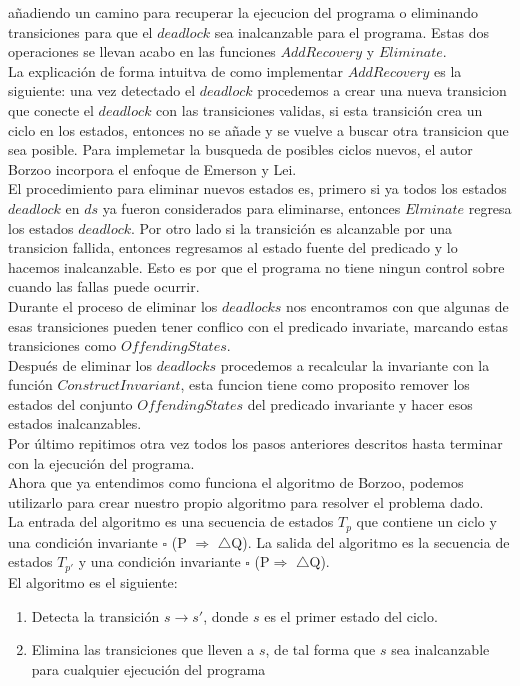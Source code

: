 \documentclass{article}
\begin{document}
\begin{enumerate}
{añadiendo un camino para recuperar la ejecucion del programa o
eliminando transiciones para que el $deadlock$ sea inalcanzable para
el programa. Estas dos operaciones se llevan acabo en las funciones
$AddRecovery$ y $Eliminate$.\\
La explicación de forma intuitva de como implementar $AddRecovery$ es
la siguiente: una vez detectado el $deadlock$ procedemos a crear una
nueva transicion que conecte el $deadlock$ con las transiciones
validas, si esta transición crea un ciclo en los estados, entonces no
se añade y se vuelve a buscar otra transicion que sea posible. Para
implemetar la busqueda de posibles ciclos nuevos, el autor Borzoo
incorpora el enfoque de Emerson y Lei.\\
El procedimiento para eliminar nuevos estados es, primero si ya todos
los estados $deadlock$ en $ds$ ya fueron considerados para eliminarse,
entonces $Elminate$ regresa los estados $deadlock$. Por otro lado si la
transición es alcanzable por una transicion fallida, entonces
regresamos al estado fuente del predicado y lo hacemos
inalcanzable. Esto es por que el programa no tiene ningun control
sobre cuando las fallas puede ocurrir.\\ 
Durante el proceso de eliminar los $deadlocks$ nos encontramos con que
algunas de esas transiciones pueden tener conflico con el predicado
invariate, marcando estas transiciones como $OffendingStates$.\\
Después de eliminar los $deadlocks$ procedemos a recalcular la
invariante con la función $ConstructInvariant$, esta funcion tiene
como proposito remover los estados del conjunto $OffendingStates$ del
predicado invariante y hacer esos estados inalcanzables.\\
Por último repitimos otra vez todos los pasos anteriores descritos hasta
terminar con la ejecución del programa.\\

Ahora que ya entendimos como funciona el algoritmo de Borzoo, podemos
utilizarlo para crear nuestro propio algoritmo para resolver el
problema dado.\\
La entrada del algoritmo es una secuencia de estados $T_p$ que
contiene un ciclo y una condición invariante $\square$ (P
$\Rightarrow$ $\triangle$Q).
La salida del algoritmo es la secuencia de estados $T_{p'}$ y una
condición invariante $\square$ (P$\Rightarrow$ $\triangle$Q).\\
El algoritmo es el siguiente:
\begin{enumerate}
  \item{Detecta la transición $s\rightarrow s'$, donde $s$ es el
      primer estado del ciclo.
    }
  \item{Elimina las transiciones que lleven a $s$, de tal forma que
      $s$ sea inalcanzable para cualquier ejecución del programa}


\end{enumerate}}
\end{enumerate}
\end{document}
